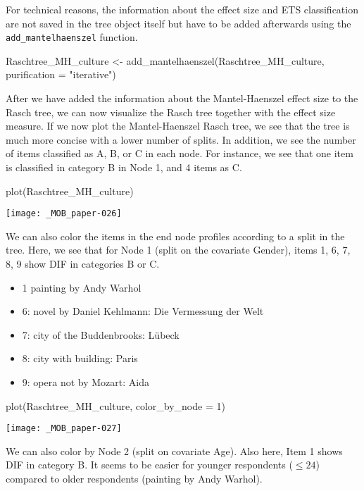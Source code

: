 \documentclass[doc,floatsintext,natbib]{apa7}
\begin{document}
For technical reasons, the information about the effect size and ETS classification are not saved in the tree object itself but have to be added afterwards using the \texttt{add\_mantelhaenszel} function. 

\begin{Schunk}
\begin{Sinput}
 Raschtree_MH_culture <- add_mantelhaenszel(Raschtree_MH_culture, 
                                            purification = "iterative")
\end{Sinput}
\end{Schunk}

After we have added the information about the Mantel-Haenszel effect size to the Rasch tree, we can now visualize the Rasch tree together with the effect size measure. If we now plot the Mantel-Haenszel Rasch tree, we see that the tree is much more concise with a lower number of splits. In addition, we see the number of items classified as A, B, or C in each node. For instance, we see that one item is classified in category B in Node 1, and 4 items as C.

\begin{Schunk}
\begin{Sinput}
 plot(Raschtree_MH_culture)
\end{Sinput}
\end{Schunk}
\texttt{[image: \_MOB\_paper-026]}

We can also color the items in the end node profiles according to a split in the tree. Here, we see that for Node 1 (split on the covariate Gender), items 1, 6, 7, 8, 9 show DIF in categories B or C. 

\begin{itemize}
\item 1 painting by Andy Warhol
\item 6: novel by Daniel Kehlmann: Die Vermessung der Welt
\item 7: city of the Buddenbrooks: Lübeck
\item 8: city with building: Paris
\item 9: opera not by Mozart: Aida
\end{itemize}

\begin{Schunk}
\begin{Sinput}
 plot(Raschtree_MH_culture, color_by_node = 1)
\end{Sinput}
\end{Schunk}
\texttt{[image: \_MOB\_paper-027]}

We can also color by Node 2 (split on covariate Age). Also here, Item 1 shows DIF in category B. It seems to be easier for younger respondents ($\leq 24$) compared to older respondents (painting by Andy Warhol).  
\end{document}
